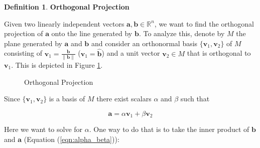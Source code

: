 \documentclass{article}
\theoremstyle{definition}
\newtheorem{definition}{Definition}[section]
\begin{document}
\smallskip
\begin{definition} 
{\bf Orthogonal Projection} 

\bigskip
\noindent
Given two linearly independent vectors $\mathbf{a},\mathbf{b} \in
\mathbb{R}^{n}$, we want to find the orthogonal projection of
$\mathbf{a}$ onto the line generated by $\mathbf{b}$. To analyze
this, denote by $M$ the plane generated by $\mathbf{a}$
and $\mathbf{b}$ and consider an orthonormal basis
$\{\mathbf{v}_1,\mathbf{v}_2\}$ of $M$ consisting of
$\mathbf{v}_1 = \frac{\mathbf{b}}{\| \mathbf{b} \|}$
($\mathbf{v}_1 = \mathbf{\hat{b}}$) and a unit vector
$\mathbf{v}_2 \in M$ that is orthogonal to $\mathbf{v}_1$.  
This is depicted in Figure \ref{fig:orthogonal_projection}.



\bigskip
\begin{figure}[H]
\caption{Orthogonal Projection}
\label{fig:orthogonal_projection}
\end{figure}



\bigskip
\noindent
Since $\{ \mathbf{v}_1, \mathbf{v}_2\}$ is a basis of $M$ there
exist scalars $\alpha$ and $\beta$ such that

\smallskip
\begin{equation}
\mathbf{a} = \alpha \mathbf{v}_1 + \beta \mathbf{v}_2
\label{eqn:alpha_beta}
\end{equation}

\bigskip
\noindent
Here we want to solve for $\alpha$. One way to do that is 
to take the inner product of $\mathbf{b}$ and $\mathbf{a}$ (Equation
(\ref{eqn:alpha_beta})):


\end{definition}
\end{document}
